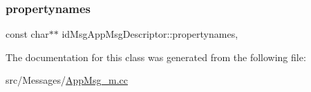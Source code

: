 \subsubsection{\texorpdfstring{propertynames}{propertynames}}
{\footnotesize\ttfamily const char$\ast$$\ast$ id\+Msg\+App\+Msg\+Descriptor\+::propertynames\hspace{0.3cm}{\ttfamily [mutable]}, {\ttfamily [private]}}



The documentation for this class was generated from the following file\+:\begin{DoxyCompactItemize}
\item 
src/\+Messages/\hyperlink{AppMsg__m_8cc}{App\+Msg\+\_\+m.\+cc}\end{DoxyCompactItemize}
